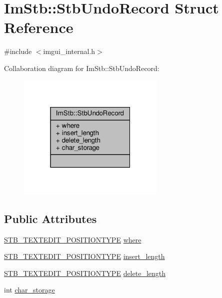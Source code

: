 \hypertarget{structImStb_1_1StbUndoRecord}{}\section{Im\+Stb\+:\+:Stb\+Undo\+Record Struct Reference}
\label{structImStb_1_1StbUndoRecord}


{\ttfamily \#include $<$imgui\+\_\+internal.\+h$>$}



Collaboration diagram for Im\+Stb\+:\+:Stb\+Undo\+Record\+:
\nopagebreak
\begin{figure}[H]
\begin{center}
\leavevmode
\includegraphics[width=199pt]{structImStb_1_1StbUndoRecord__coll__graph}
\end{center}
\end{figure}
\subsection*{Public Attributes}
\begin{DoxyCompactItemize}
\item 
\hyperlink{imstb__textedit_8h_a5d0c1b8751b6517e3d817f2a025ed654}{S\+T\+B\+\_\+\+T\+E\+X\+T\+E\+D\+I\+T\+\_\+\+P\+O\+S\+I\+T\+I\+O\+N\+T\+Y\+PE} \hyperlink{structImStb_1_1StbUndoRecord_af2d8dd183ed445623c4c71e2ff8b4970}{where}
\item 
\hyperlink{imstb__textedit_8h_a5d0c1b8751b6517e3d817f2a025ed654}{S\+T\+B\+\_\+\+T\+E\+X\+T\+E\+D\+I\+T\+\_\+\+P\+O\+S\+I\+T\+I\+O\+N\+T\+Y\+PE} \hyperlink{structImStb_1_1StbUndoRecord_a05a5af46ce69bd4aeecb243fc1cba915}{insert\+\_\+length}
\item 
\hyperlink{imstb__textedit_8h_a5d0c1b8751b6517e3d817f2a025ed654}{S\+T\+B\+\_\+\+T\+E\+X\+T\+E\+D\+I\+T\+\_\+\+P\+O\+S\+I\+T\+I\+O\+N\+T\+Y\+PE} \hyperlink{structImStb_1_1StbUndoRecord_a6b532830e366680607d3acd49f0aaf62}{delete\+\_\+length}
\item 
int \hyperlink{structImStb_1_1StbUndoRecord_a56d6d4fb37caf804700b294fb1fab9a1}{char\+\_\+storage}
\end{DoxyCompactItemize}


